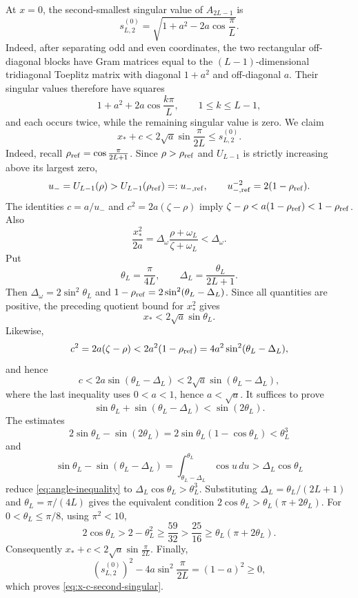 \documentclass[a4paper,preprint,12pt,nopreprintline,sort&compress]{elsarticle}
\numberwithin{equation}{section}
\theoremstyle{remark}
\begin{document}
At \(x=0\), the second-smallest singular value of \(A_{2L-1}\) is
\[
 s_{L,2}^{(0)}=\sqrt{1+a^2-2a\cos\frac{\pi}{L}}.
\]
Indeed, after separating odd and even coordinates, the two rectangular
off-diagonal blocks have Gram matrices equal to the
\((L-1)\)-dimensional tridiagonal Toeplitz matrix with diagonal
\(1+a^2\) and off-diagonal \(a\).  Their singular values therefore have
squares
\[
 1+a^2+2a\cos\frac{k\pi}{L},\qquad 1\leq k\leq L-1,
\]
and each occurs twice, while the remaining singular value is zero.
We claim
\begin{equation}
 x_*+c<2\sqrt a\sin\frac{\pi}{2L}\leq s_{L,2}^{(0)}.
\end{equation}
Indeed, recall \(\rho_{\rm ref}=\cos\frac{\pi}{2L+1}\).  Since
\(\rho>\rho_{\rm ref}\) and \(U_{L-1}\) is strictly increasing above its
largest zero,
\[
 u_-=U_{L-1}(\rho)>U_{L-1}(\rho_{\rm ref})=:u_{-,\rm ref},
 \qquad u_{-,\rm ref}^{-2}=2(1-\rho_{\rm ref}).
\]
The identities \(c=a/u_-\) and \(c^2=2a(\zeta-\rho)\) imply
\(\zeta-\rho<a(1-\rho_{\rm ref})<1-\rho_{\rm ref}\).  Also
\[
 \frac{x_*^2}{2a}
 =\Delta_\omega\frac{\rho+\omega_L}{\zeta+\omega_L}
 <\Delta_\omega.
\]
Put
\[
 \theta_L=\frac{\pi}{4L},\qquad
 \Delta_L=\frac{\theta_L}{2L+1}.
\]
Then \(\Delta_\omega=2\sin^2\theta_L\) and
\(1-\rho_{\rm ref}=2\sin^2(\theta_L-\Delta_L)\).  Since all quantities are
positive, the preceding quotient bound for \(x_*^2\) gives
\[
 x_*<2\sqrt a\sin\theta_L.
\]
Likewise,
\[
 c^2=2a(\zeta-\rho)
 <2a^2(1-\rho_{\rm ref})
 =4a^2\sin^2(\theta_L-\Delta_L),
\]
and hence
\[
 c<2a\sin(\theta_L-\Delta_L)
 <2\sqrt a\sin(\theta_L-\Delta_L),
\]
where the last inequality uses \(0<a<1\), hence \(a<\sqrt a\).
It suffices to prove
\begin{equation}\label{eq:angle-inequality}
 \sin\theta_L+\sin(\theta_L-\Delta_L)<\sin(2\theta_L).
\end{equation}
The estimates
\[
 2\sin\theta_L-\sin(2\theta_L)
 =2\sin\theta_L(1-\cos\theta_L)<\theta_L^3
\]
and
\[
 \sin\theta_L-\sin(\theta_L-\Delta_L)
 =\int_{\theta_L-\Delta_L}^{\theta_L}\cos u\,du
 >\Delta_L\cos\theta_L
\]
reduce \eqref{eq:angle-inequality} to
\(\Delta_L\cos\theta_L>\theta_L^3\).  Substituting
\(\Delta_L=\theta_L/(2L+1)\) and \(\theta_L=\pi/(4L)\) gives the equivalent
condition \(2\cos\theta_L>\theta_L(\pi+2\theta_L)\).  For
\(0<\theta_L\leq\pi/8\), using \(\pi^2<10\),
\[
 2\cos\theta_L>2-\theta_L^2\geq\frac{59}{32}
 >\frac{25}{16}\geq\theta_L(\pi+2\theta_L).
\]
Consequently \(x_*+c<2\sqrt a\sin\frac{\pi}{2L}\).  Finally,
\[
 (s_{L,2}^{(0)})^2-4a\sin^2\frac{\pi}{2L}
 =(1-a)^2\geq0,
\]
which proves \eqref{eq:x-c-second-singular}.
\end{document}
